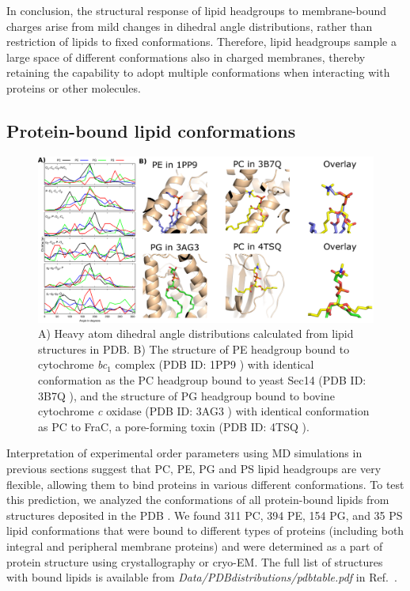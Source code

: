 \documentclass[aps,prl,superscriptaddress,twocolumn]{revtex4}
\begin{document}
In conclusion, the structural response of lipid headgroups to 
membrane-bound charges arise
from mild changes in dihedral angle distributions, rather than restriction of lipids to
fixed conformations. Therefore, lipid headgroups sample a large space of different conformations
also in charged membranes, thereby retaining the capability to adopt multiple conformations when
interacting with proteins or other molecules.



\subsection{Protein-bound lipid conformations}

\begin{figure}[]
  \centering
  \includegraphics[width=19.0cm]{./Figs/figure4.eps}
  \caption{\label{dihedralsFROMpdb}
    A) Heavy atom dihedral angle distributions calculated from lipid structures in PDB.
    B) The structure of PE headgroup bound to cytochrome {\it bc}$_1$ complex (PDB ID: 1PP9 \cite{huang05})
    with identical conformation as the PC headgroup bound to yeast Sec14 (PDB ID: 3B7Q \cite{schaaf08}),
    and the structure of PG headgroup bound to bovine cytochrome {\it c} oxidase (PDB ID: 3AG3 \cite{muramoto10})
    with identical conformation as PC to FraC, a pore-forming toxin (PDB ID: 4TSQ \cite{tanaka15}).
  }
\end{figure}


Interpretation of experimental order parameters using MD simulations
in previous sections suggest that PC, PE, PG and PS lipid headgroups are very flexible,
allowing them to bind proteins in various different conformations.
To test this prediction, we analyzed the conformations of all protein-bound lipids 
from structures deposited in the PDB \cite{berman00}.
We found 311 PC, 394 PE, 154 PG, and 35 PS lipid conformations that were bound to different types of proteins 
(including both integral and peripheral membrane proteins) and were determined as a part of protein structure using crystallography or cryo-EM. The full list of structures with bound lipids is available from {\it Data/PDBdistributions/pdbtable.pdf} in Ref.~\cite{NMRlipidsIVbgit}.
\end{document}
